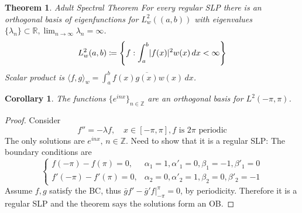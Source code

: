 \documentclass{article}
\newtheorem{theorem}{Theorem}
\newtheorem{corollary}{Corollary}[theorem]
\DeclarePairedDelimiter\abs{\lvert}{\rvert}
\begin{document}
\begin{theorem}{Adult Spectral Theorem}
	For \emph{every} regular SLP there is an orthogonal basis of eigenfunctions
	for $L_w^2((a, b))$ with eigenvalues $\{\lambda_n\} \subset \mathbb R, \lim_{n \to \infty} \lambda_n = \infty$.
	$$ L_w^2(a, b) \coloneqq \left\{f: \int_a^b \abs{f(x)}^2 w(x) \, dx < \infty\right\} $$
	Scalar product is $\langle f, g \rangle_w = \int_a^b f(x) \overline{g(x)} w(x) \, dx$.
\end{theorem}

\begin{corollary}
	The functions $\{e^{inx}\}_{n \in \mathbb Z}$ are an orthogonal basis for $L^2(-\pi, \pi)$.
\end{corollary}
\begin{proof}
	Consider
	$$ f'' = -\lambda f, \quad x \in [-\pi, \pi], f \text{ is } 2\pi \text{ periodic} $$
	The only solutions are $e^{inx}, \, n \in \mathbb Z$.
	Need to show that it is a regular SLP: The boundary conditions are
	$$ \left\{ \begin{array}{lr}
		f(-\pi) - f(\pi) = 0, & \alpha_1 = 1, \alpha'_1 = 0, \beta_1 = -1, \beta'_1 = 0 \\
		f'(-\pi) - f'(\pi) = 0, & \alpha_2 = 0, \alpha'_2 = 1, \beta_2 = 0, \beta'_2 = -1
	\end{array} \right. $$
	Assume $f, g$ satisfy the BC, thus $\left. \bar g f' - \bar g' f \right\rvert_{-\pi}^\pi = 0$, by periodicity.
	Therefore it is a regular SLP and the theorem says the solutions form an OB.
\end{proof}
\end{document}
